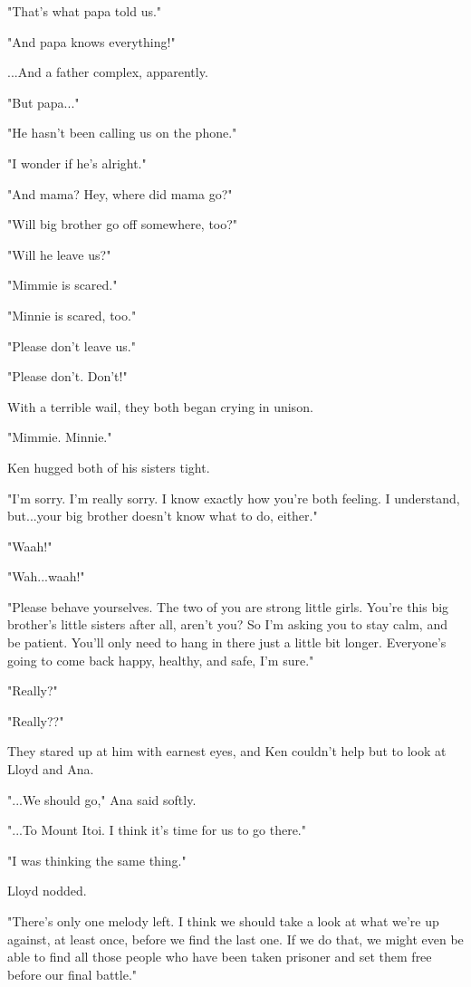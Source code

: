 \documentclass[
]{article}
\begin{document}
"That's what papa told us."

"And papa knows everything!"

...And a father complex, apparently.

"But papa..."

"He hasn't been calling us on the phone."

"I wonder if he's alright."

"And mama? Hey, where did mama go?"

"Will big brother go off somewhere, too?"

"Will he leave us?"

"Mimmie is scared."

"Minnie is scared, too."

"Please don't leave us."

"Please don't. Don't!"

With a terrible wail, they both began crying in unison.

"Mimmie. Minnie."

Ken hugged both of his sisters tight.

"I'm sorry. I'm really sorry. I know exactly how you're both feeling. I
understand, but...your big brother doesn't know what to do, either."

"Waah!"

"Wah...waah!"

"Please behave yourselves. The two of you are strong little girls.
You're this big brother's little sisters after all, aren't you? So I'm
asking you to stay calm, and be patient. You'll only need to hang in
there just a little bit longer. Everyone's going to come back happy,
healthy, and safe, I'm sure."

"Really?"

"Really??"

They stared up at him with earnest eyes, and Ken couldn't help but to
look at Lloyd and Ana.

"...We should go," Ana said softly.

"...To Mount Itoi. I think it's time for us to go there."

"I was thinking the same thing."

Lloyd nodded.

"There's only one melody left. I think we should take a look at what
we're up against, at least once, before we find the last one. If we do
that, we might even be able to find all those people who have been taken
prisoner and set them free before our final battle."
\end{document}
